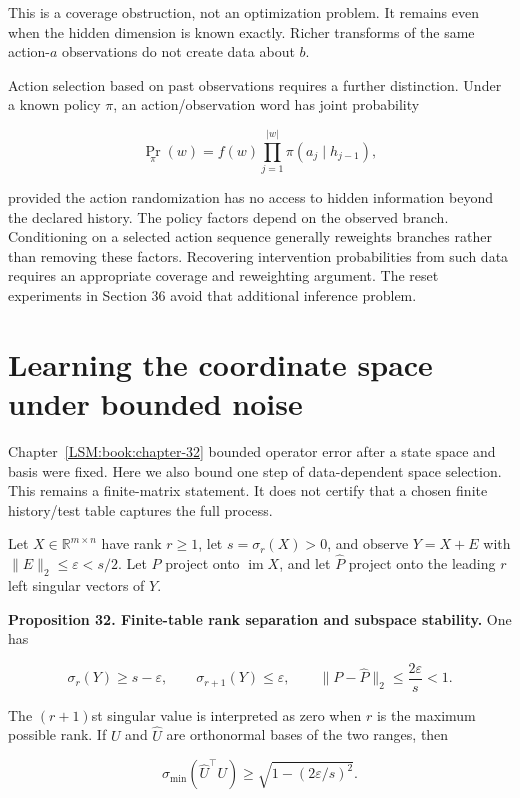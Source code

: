This is a coverage obstruction, not an optimization problem. It remains
even when the hidden dimension is known exactly. Richer transforms of
the same action-\(a\) observations do not create data about \(b\).

Action selection based on past observations requires a further
distinction. Under a known policy \(\pi\), an action/observation word
has joint probability

\[
\Pr_\pi(w)=f(w)\prod_{j=1}^{|w|}\pi(a_j\mid h_{j-1}),
\]

provided the action randomization has no access to hidden information
beyond the declared history. The policy factors depend on the observed
branch. Conditioning on a selected action sequence generally reweights
branches rather than removing these factors. Recovering intervention
probabilities from such data requires an appropriate coverage and
reweighting argument. The reset experiments in Section 36 avoid that
additional inference problem.

\section{Learning the coordinate space under bounded noise}\label{LSM:learning-the-coordinate-space-under-bounded-noise}

Chapter~\ref{LSM:book:chapter-32} bounded operator error after a state space and basis were fixed.
Here we also bound one step of data-dependent space selection. This
remains a finite-matrix statement. It does not certify that a chosen
finite history/test table captures the full process.

Let \(X\in\mathbb R^{m\times n}\) have rank \(r\geq1\), let
\(s=\sigma_r(X)>0\), and observe \(Y=X+E\) with
\(\|E\|_2\leq\varepsilon<s/2\). Let \(P\) project onto
\(\operatorname{im}X\), and let \(\widehat P\) project onto the leading
\(r\) left singular vectors of \(Y\).

\textbf{Proposition 32. Finite-table rank separation and subspace
stability.} One has

\[
\sigma_r(Y)\geq s-\varepsilon,\qquad
\sigma_{r+1}(Y)\leq\varepsilon,\qquad
\|P-\widehat P\|_2\leq\frac{2\varepsilon}{s}<1.
\]

The \((r+1)\)st singular value is interpreted as zero when \(r\) is the
maximum possible rank. If \(U\) and \(\widehat U\) are orthonormal bases
of the two ranges, then

\[
\sigma_{\min}(\widehat U^\top U)
\geq\sqrt{1-(2\varepsilon/s)^2}.
\]

